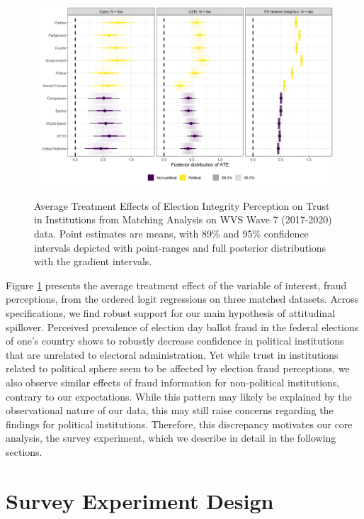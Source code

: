 \documentclass[11pt, ngerman,english,a4]{article}
\begin{document}
\begin{figure}[t]
	\centering
	\includegraphics[width=\linewidth,trim=4 4 4 4,clip]{figs/matching.png}\\
	\caption{Average Treatment Effects of Election Integrity Perception on Trust in Institutions from Matching Analysis on WVS Wave 7 (2017-2020) data. Point estimates are means, with 89\% and 95\% confidence intervals depicted with point-ranges and full posterior distributions with the gradient intervals.} 
	\label{fig:matching}
\end{figure}

Figure \ref{fig:matching} presents the average treatment effect of the variable of interest, fraud perceptions, from the ordered logit regressions on three matched datasets. Across specifications, we find robust support for our main hypothesis of attitudinal spillover. Perceived prevalence of election day ballot fraud in the federal elections of one's country shows to robustly decrease confidence in political institutions that are unrelated to electoral administration. Yet while trust in institutions related to political sphere seem to be affected by election fraud perceptions, we also observe similar effects of fraud information for non-political institutions, contrary to our expectations. While this pattern may likely be explained by the observational nature of our data, this may still raise concerns regarding the findings for political institutions. Therefore, this discrepancy motivates our core analysis, the survey experiment, which we describe in detail in the following sections. 



\newpage
\section*{Survey Experiment Design}
\end{document}
